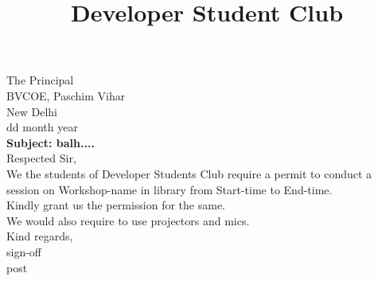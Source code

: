 \documentclass[12pt,a4paper]{article} %
\title{Developer Student Club}
\begin{document}
	
	\date{}
	\maketitle
	\hspace{-8mm}
	The Principal \\
	BVCOE, Paschim Vihar\\
	New Delhi\\
	\linebreak
	dd month year\\
	\linebreak
	\textbf{Subject: balh....}\\
	\linebreak
	Respected Sir,\\
	
	\vspace{-5mm}
	\hspace{8mm}
	We the students of Developer Students Club require a permit to conduct a session on 
	Workshop-name 
	in library from 
	Start-time 
	to 
	End-time.\\
	Kindly grant us the permission for the same. \\
	We would also require to use projectors and mics.\\
	\linebreak
	Kind regards,\\
	sign-off\\
	post 
	
\end{document}
